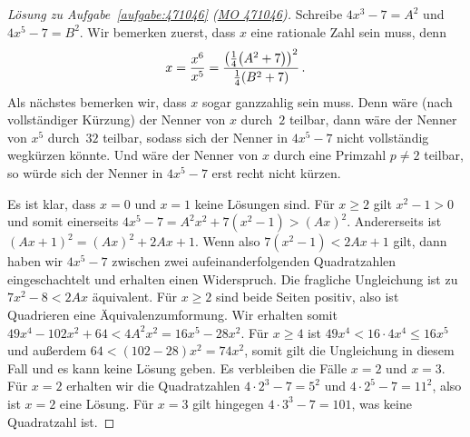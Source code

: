 \begin{proof}[Lösung zu Aufgabe~\ref{aufgabe:471046} \textmd{(\href{https://www.mathematik-olympiaden.de/moev/index.php?option=com_download&thema=a&format=raw&datei=A47104b.pdf}{MO 471046})}]
	Schreibe $4x^3-7=A^2$ und $4x^5-7=B^2$. Wir bemerken zuerst, dass $x$ eine rationale Zahl sein muss, denn
	\begin{equation*}
		x=\frac{x^6}{x^5}=\frac{\parens*{\frac14\parens*{A^2+7}}^2}{\frac14\parens*{B^2+7}}\,.
	\end{equation*}
	Als nächstes bemerken wir, dass $x$ sogar ganzzahlig sein muss. Denn wäre (nach vollständiger Kürzung) der Nenner von $x$ durch~$2$ teilbar, dann wäre der Nenner von $x^5$ durch~$32$ teilbar, sodass sich der Nenner in $4x^5-7$ nicht vollständig wegkürzen könnte. Und wäre der Nenner von $x$ durch eine Primzahl $p\neq 2$ teilbar, so würde sich der Nenner in $4x^5-7$ erst recht nicht kürzen.
	
	Es ist klar, dass $x=0$ und $x=1$ keine Lösungen sind. Für $x\geqslant 2$ gilt $x^2-1>0$ und somit einerseits $4x^5-7=A^2x^2+7(x^2-1)>(Ax)^2$. Andererseits ist $(Ax+1)^2=(Ax)^2+2Ax+1$. Wenn also $7(x^2-1)<2Ax+1$ gilt, dann haben wir $4x^5-7$ zwischen zwei aufeinanderfolgenden Quadratzahlen eingeschachtelt und erhalten einen Widerspruch. Die fragliche Ungleichung ist zu $7x^2-8<2Ax$ äquivalent. Für $x\geqslant 2$ sind beide Seiten positiv, also ist Quadrieren eine Äquivalenzumformung. Wir erhalten somit $49x^4-102x^2+64<4A^2x^2=16x^5-28x^2$. Für $x\geqslant 4$ ist $49x^4<16\cdot 4x^4\leqslant 16x^5$ und außerdem $64<(102-28)x^2=74x^2$, somit gilt die Ungleichung in diesem Fall und es kann keine Lösung geben. Es verbleiben die Fälle $x=2$ und $x=3$. Für $x=2$ erhalten wir die Quadratzahlen $4\cdot 2^3-7=5^2$ und $4\cdot 2^5-7=11^2$, also ist $x=2$ eine Lösung. Für $x=3$ gilt hingegen $4\cdot 3^3-7=101$, was keine Quadratzahl ist.
\end{proof}


